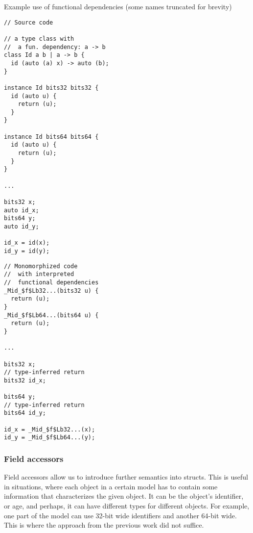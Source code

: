 \begin{listing}
    \caption{Example use of functional dependencies (some names truncated for brevity)}
    \label{lst:fundeps}
    \begin{center}
    \begin{minipage}{0.5\linewidth}
    \begin{lstlisting}[basicstyle=\scriptsize\ttfamily]
// Source code

// a type class with
//  a fun. dependency: a -> b
class Id a b | a -> b {
  id (auto (a) x) -> auto (b);
}

instance Id bits32 bits32 {
  id (auto u) {
    return (u);
  }
}

instance Id bits64 bits64 {
  id (auto u) {
    return (u);
  }
}

...

bits32 x;
auto id_x;
bits64 y;
auto id_y;

id_x = id(x);
id_y = id(y);
    \end{lstlisting}
    \end{minipage}%
    \begin{minipage}{0.5\linewidth}
    \begin{lstlisting}[basicstyle=\scriptsize\ttfamily]
// Monomorphized code
//  with interpreted
//  functional dependencies
_Mid_$f$Lb32...(bits32 u) {
  return (u);
}
_Mid_$f$Lb64...(bits64 u) {
  return (u);
}

...

bits32 x;
// type-inferred return
bits32 id_x;

bits64 y;
// type-inferred return
bits64 id_y;

id_x = _Mid_$f$Lb32...(x);
id_y = _Mid_$f$Lb64...(y);
    \end{lstlisting}
    \end{minipage}
    \end{center}
\end{listing}

\subsubsection{Field accessors}

Field accessors allow us to introduce further semantics into structs. This is useful in situations, where each object in a certain model has to contain some information that characterizes the given object. It can be the object's identifier, or age, and perhaps, it can have different types for different objects. For example, one part of the model can use 32-bit wide identifiers and another 64-bit wide. This is where the approach from the previous work did not suffice.

